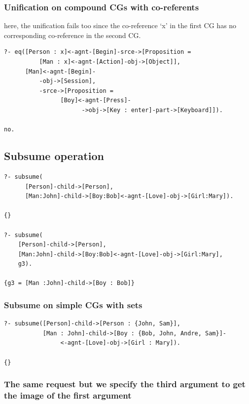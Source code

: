 \documentclass{book}
\begin{document}
\subsubsection{Unification on compound CGs with co-referents}

here, the unification fails too since the co-reference `x' in the
first CG has no corresponding co-reference in the second CG.



\begin{verbatim}
?- eq([Person : x]<-agnt-[Begin]-srce->[Proposition = 
          [Man : x]<-agnt-[Action]-obj->[Object]],
      [Man]<-agnt-[Begin]-
          -obj->[Session],
          -srce->[Proposition =
                [Boy]<-agnt-[Press]-
                      ->obj->[Key : enter]-part->[Keyboard]]).

no.
\end{verbatim}





\subsection{Subsume operation}


\begin{verbatim}
?- subsume(
      [Person]-child->[Person],
      [Man:John]-child->[Boy:Bob]<-agnt-[Love]-obj->[Girl:Mary]).

{}

?- subsume(
    [Person]-child->[Person],
    [Man:John]-child->[Boy:Bob]<-agnt-[Love]-obj->[Girl:Mary],
    g3).

{g3 = [Man :John]-child->[Boy : Bob]}
\end{verbatim}





\subsubsection{Subsume on simple CGs with sets}


\begin{verbatim}
?- subsume([Person]-child->[Person : {John, Sam}],
           [Man : John]-child->[Boy : {Bob, John, Andre, Sam}]-
                <-agnt-[Love]-obj->[Girl : Mary]).

{}
\end{verbatim}


\subsubsection{The same request but we specify the third argument to get the
image of the first argument}
\end{document}
